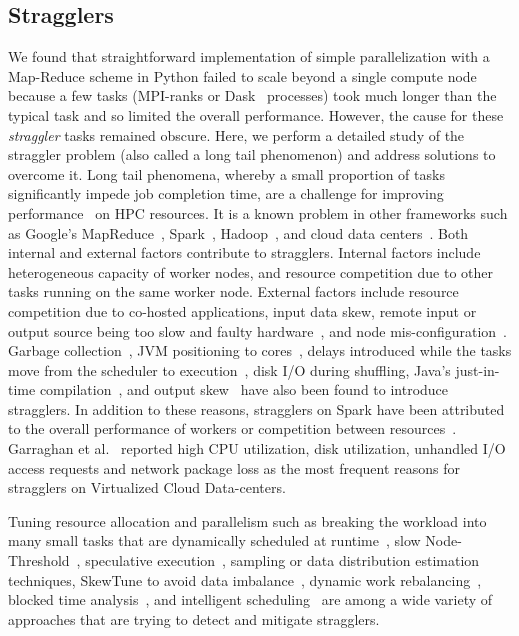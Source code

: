 \label{background}

\subsection{Stragglers}
\label{sec:stragglers}


We found that straightforward implementation of simple parallelization with a Map-Reduce scheme in Python failed to scale beyond a single compute node~\cite{Khoshlessan:2017ab} because a few tasks (MPI-ranks or Dask~\citep{Rocklin:2015aa} processes) took much longer than the typical task and so limited the overall performance.
However, the cause for these \emph{straggler} tasks remained obscure.
Here, we perform a detailed study of the straggler problem (also called a long tail phenomenon) and address solutions to overcome it.
Long tail phenomena, whereby a small proportion of tasks significantly impede job completion time, are a challenge for improving performance~\cite{Garraghan2016} on HPC resources.
It is a known problem in other frameworks such as Google's MapReduce~\cite{Dean2004}, Spark~\cite{Kyong2017,Ousterhout2017,Gittens2016}, Hadoop~\cite{Dean2004}, and cloud data centers~\cite{Schmidt2016}. Both internal and external factors contribute to stragglers. 
Internal factors include heterogeneous capacity of worker nodes, and resource competition due to other tasks running on the same worker node. 
External factors include resource competition due to co-hosted applications, input data skew, remote input or output source being too slow and faulty hardware~\cite{Chen2014,Dean2004}, and node mis-configuration~\cite{Dean2004}. 
Garbage collection~\cite{Kyong2017,Ousterhout2017}, JVM positioning to cores~\cite{Kyong2017}, delays introduced while the tasks move from the scheduler to execution~\cite{Gittens2016}, disk I/O during shuffling, Java's just-in-time compilation~\cite{Ousterhout2017}, and output skew~\cite{Ousterhout2017} have also been found to introduce stragglers.
In addition to these reasons, stragglers on Spark have been attributed to the overall performance of workers or competition between resources~\cite{Yang2016}.
Garraghan et al.~\cite{Garraghan2016} reported high CPU utilization, disk utilization, unhandled I/O access requests and network package loss as the most frequent reasons for stragglers on Virtualized Cloud Data-centers.

Tuning resource allocation and parallelism such as breaking the workload into many small tasks that are dynamically scheduled at runtime~\cite{Rosen2012}, slow Node-Threshold~\cite{Dean2004}, speculative execution~\cite{Dean2004}, sampling or data distribution estimation techniques, SkewTune to avoid data imbalance~\cite{Kwon2012}, dynamic work rebalancing~\cite{Schmidt2016}, blocked time analysis~\cite{Ousterhout2015}, and intelligent scheduling~\cite{AWE-WQ2014} are among a wide variety of approaches that are trying to detect and mitigate stragglers. 

